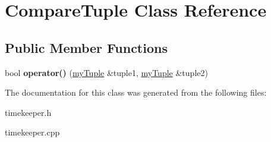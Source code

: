 \hypertarget{classCompareTuple}{\section{\-Compare\-Tuple \-Class \-Reference}
\label{classCompareTuple}
}
\subsection*{\-Public \-Member \-Functions}
\begin{DoxyCompactItemize}
\item 
\hypertarget{classCompareTuple_a2a749dcd5ef689e812709b52387bb0ce}{bool {\bfseries operator()} (\hyperlink{classmyTuple}{my\-Tuple} \&tuple1, \hyperlink{classmyTuple}{my\-Tuple} \&tuple2)}\label{classCompareTuple_a2a749dcd5ef689e812709b52387bb0ce}

\end{DoxyCompactItemize}


\-The documentation for this class was generated from the following files\-:\begin{DoxyCompactItemize}
\item 
timekeeper.\-h\item 
timekeeper.\-cpp\end{DoxyCompactItemize}
